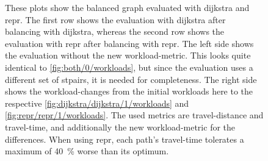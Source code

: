         \begin{figure}[hbp]
            \centering%
            \hfill%

            \hfill%
            \caption[Initial workloads and workload-changes when evaluating]{%
                These plots show the balanced graph evaluated with \gls{dijkstra} and \gls{repr}.
                The first row shows the evaluation with \gls{dijkstra} after \gls{balancing} with \gls{dijkstra}, whereas the second row shows the evaluation with \gls{repr} after \gls{balancing} with \gls{repr}.
                The left side shows the evaluation without the new workload-\gls{metric}.
                This looks quite identical to \vref{fig:both/0/workloads}, but since the evaluation uses a different set of \glspl{stpair}, it is needed for completeness.
                The right side shows the workload-changes from the initial workloads here to the respective \cref{fig:dijkstra/dijkstra/1/workloads} and \cref{fig:repr/repr/1/workloads}.
                The used \glspl{metric} are travel-distance and travel-time, and additionally the new workload-\gls{metric} for the differences.
                When using \gls{repr}, each path's travel-time tolerates a maximum of \si{\num{40} \percent} worse than its optimum.
                \label{fig:both/both/0/workloads}
                \label{fig:both/both/1/delta_workloads}
            }
        \end{figure}

